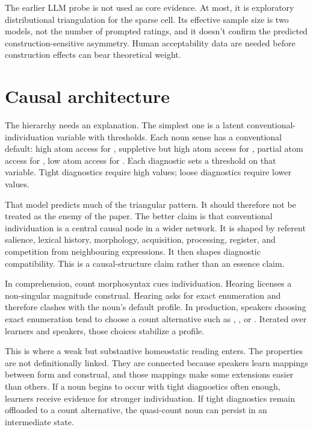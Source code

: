 \documentclass[12pt,a4paper]{article}
\begin{document}
The earlier LLM probe is not used as core evidence. At most, it is exploratory distributional triangulation for the sparse  cell. Its effective sample size is two models, not the number of prompted ratings, and it doesn't confirm the predicted construction-sensitive asymmetry. Human acceptability data are needed before construction effects can bear theoretical weight.

\section{Causal architecture}\label{sec:causal-v3}

The hierarchy needs an explanation. The simplest one is a latent conventional-individuation variable with thresholds. Each noun sense has a conventional default: high atom access for , suppletive but high atom access for , partial atom access for , low atom access for . Each diagnostic sets a threshold on that variable. Tight diagnostics require high values; loose diagnostics require lower values.

That model predicts much of the triangular pattern. It should therefore not be treated as the enemy of the paper. The better claim is that conventional individuation is a central causal node in a wider network. It is shaped by referent salience, lexical history, morphology, acquisition, processing, register, and competition from neighbouring expressions. It then shapes diagnostic compatibility. This is a causal-structure claim rather than an essence claim.

In comprehension, count morphosyntax cues individuation. Hearing  licenses a non-singular magnitude construal. Hearing  asks for exact enumeration and therefore clashes with the noun's default profile. In production, speakers choosing exact enumeration tend to choose a count alternative such as , , or . Iterated over learners and speakers, those choices stabilize a profile.

This is where a weak but substantive homeostatic reading enters. The properties are not definitionally linked. They are connected because speakers learn mappings between form and construal, and those mappings make some extensions easier than others. If a noun begins to occur with tight diagnostics often enough, learners receive evidence for stronger individuation. If tight diagnostics remain offloaded to a count alternative, the quasi-count noun can persist in an intermediate state.
\end{document}
